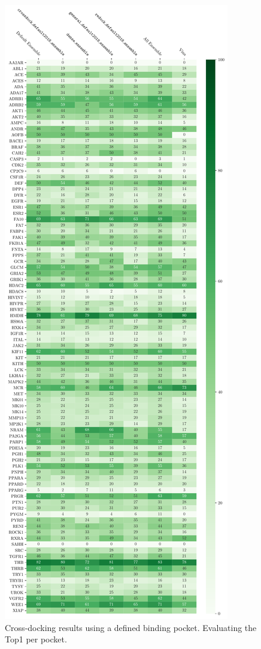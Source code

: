 \documentclass[journal=jcisd8,manuscript=article]{achemso}
\begin{document}
\begin{figure}
    \centering
    \includegraphics[height=0.9\textheight]{figures/crossdocking/top1_per_pocket.pdf}
    \caption{Cross-docking results using a defined binding pocket. Evaluating the Top1 per pocket.}
    \label{fig:Top1_PerPock}
\end{figure}
\end{document}

